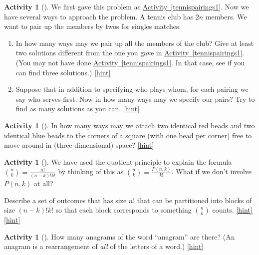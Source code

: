 \documentclass[10pt,]{book}
\theoremstyle{plain}
\theoremstyle{definition}
\theoremstyle{definition}
\theoremstyle{definition}
\newtheorem{activity}[project]{Activity}
\numberwithin{equation}{chapter}
\begin{document}
\begin{activity}[]\label{tennispairings2}
\hypertarget{p-770}{}%
We first gave this problem as \hyperref[tennispairings1]{Activity~\ref{tennispairings1}}. Now we have several ways to approach the problem. A tennis club has \(2n\) members. We want to pair up the members by twos for singles matches.%
\begin{enumerate}[font=\bfseries,label=(\alph*),ref=\alph*]
\item\label{task-145} \hypertarget{p-771}{}%
In how many ways may we pair up all the members of the club? Give at least two solutions different from the one you gave in   \hyperref[tennispairings1]{Activity~\ref{tennispairings1}}. (You may not have done \hyperref[tennispairings1]{Activity~\ref{tennispairings1}}. In that case, see if you can find three solutions.)%
\hfill{\tiny\hyperlink{a-112.a}{[hint]}\hypertarget{q-112.a}{}}\item\label{task-146} \hypertarget{p-775}{}%
Suppose that in addition to specifying who plays whom, for each pairing we say who serves first.  Now in how many ways may we specify our pairs? Try to find as many solutions as you can.%
\hfill{\tiny\hyperlink{a-112.b}{[hint]}\hypertarget{q-112.b}{}}\end{enumerate}
\end{activity}
\begin{activity}[]\label{twocolorsofbeads}
\hypertarget{p-779}{}%
In how many ways may we attach two identical red beads and two identical blue beads to the corners of a square (with one bead per corner) free to move around in (three-dimensional) space?%
\hfill{\tiny\hyperlink{a-113}{[hint]}\hypertarget{q-113}{}}\end{activity}
\begin{activity}[]\label{activity-107}
\hypertarget{p-782}{}%
We have used the quotient principle to explain the formula \(\binom{n}{k} = \frac{n!}{(n-k)!k!}\) by thinking of this as \(\binom{n}{k} = \frac{P(n,k)}{k!}\).  What if we don't involve \(P(n,k)\) at all?%
\par
\hypertarget{p-783}{}%
Describe a set of outcomes that has size \(n!\) that can be partitioned into blocks of size \((n-k)!k!\) so that each block corresponds to something \(\binom{n}{k}\) counts.%
\hfill{\tiny\hyperlink{a-114}{[hint]}\hypertarget{q-114}{}}\hfill{\tiny\hyperlink{a-114}{[hint]}\hypertarget{q-114}{}}\end{activity}
\begin{activity}[]\label{activity-108}
\hypertarget{p-786}{}%
How many anagrams of the word ``anagram'' are there? (An anagram is a rearrangement of \emph{all} of the letters of a word.)%
\hfill{\tiny\hyperlink{a-115}{[hint]}\hypertarget{q-115}{}}\end{activity}
\typeout{************************************************}
\typeout{************************************************}
\end{document}
